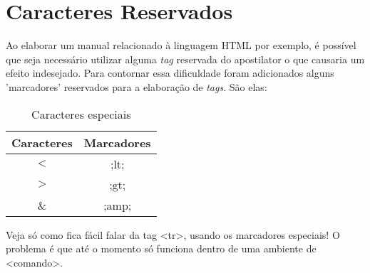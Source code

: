 \newpage \chapter{Caracteres Reservados}\setcounter{SteP}{1}
\label{chap02}

Ao elaborar um manual relacionado à linguagem HTML por exemplo, é possível que
seja necessário utilizar alguma {\it tag} reservada do apostilator o que
causaria um efeito indesejado. Para contornar essa dificuldade foram
adicionados alguns 'marcadores' reservados para a elaboração de {\it tags}.
São elas:

\begin{table}[H]
  \begin{center}
  \begin{tabular}{|c|c|}
    \hline {\bf Caracteres} 	&	 {\bf Marcadores}  \\ \hline \hline
     $<$ 	&	 ;lt;  \\ \hline
     $>$ 	&	 ;gt;  \\ \hline
     \& 	&	 ;amp;  \\ \hline
\end{tabular}
    \caption{Caracteres especiais}
    \label{tab:specialChars}
  \end{center}
\end{table}

\begin{BoxVerbatim}
Veja só como fica fácil falar da tag <tr>, usando os 
marcadores especiais! O problema é que até o momento só 
funciona dentro de uma ambiente de <comando>.
\end{BoxVerbatim}
